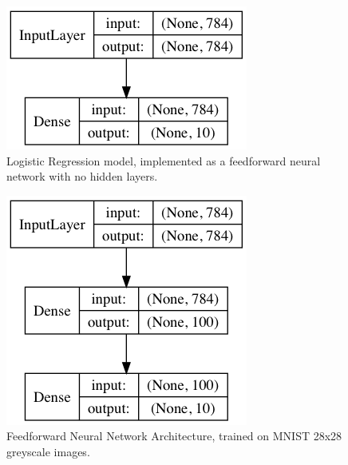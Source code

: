 \documentclass[letterpaper, 10 pt, conference]{ieeeconf}  %
\begin{document}
\begin{figure}[]
      \centering
      \includegraphics[scale = .3]{logreg_model.png}
		\centering
      \caption{Logistic Regression model, implemented as a feedforward neural network with no hidden layers.}
      \label{figurelabel}
\end{figure}

\begin{figure}[]
      \centering
      \includegraphics[scale = .3]{ffnn_model.png}
		\centering
      \caption{Feedforward Neural Network Architecture, trained on MNIST 28x28 greyscale images.}
      \label{figurelabel}
\end{figure}

\end{document}
